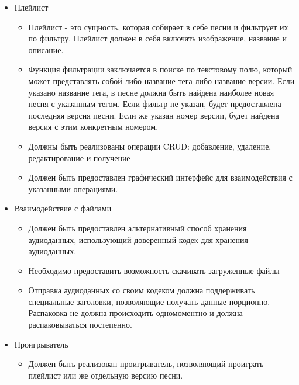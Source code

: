 \documentclass[a4paper, 12pt, oneside]{article}
\begin{document}
\begin{itemize}
\begin{itemize}
		\item Должен быть доступен чат внутри каждой из песен, где пользователи могут просматривать а также отправлять свои собственные сообщения
		\item Должна быть реализована возможность просмотра конкретной версии песни.
		\item Должны быть реализованы операции в API для выполнения вышеобозначенных операций.
		\item Необходимо предоставить графический интерфейс для работы с указанными операциями.
	\end{itemize}
	\item Плейлист
	\begin{itemize}
		\item Плейлист - это сущность, которая собирает в себе песни и фильтрует их по фильтру. Плейлист должен в себя включать изображение, название и описание.
		\item Функция фильтрации заключается в поиске по текстовому полю, который может представлять собой либо название тега либо название версии. Если указано название тега, в песне должна быть найдена наиболее новая песня с указанным тегом. Если фильтр не указан, будет предоставлена последняя версия песни. Если же указан номер версии, будет найдена версия с этим конкретным номером.
		\item Должны быть реализованы операции CRUD: добавление, удаление, редактирование и получение
		\item Должен быть предоставлен графический интерфейс для взаимодействия с указанными операциями.
	\end{itemize}
	\item Взаимодействие с файлами
	\begin{itemize}
		\item Должен быть предоставлен альтернативный способ хранения аудиоданных, использующий доверенный кодек для хранения аудиоданных.
		\item Необходимо предоставить возможность скачивать загруженные файлы
		\item Отправка аудиоданных со своим кодеком должна поддерживать специальные заголовки, позволяющие получать данные порционно. Распаковка не должна происходить одномоментно и должна распаковываться постепенно.
	\end{itemize}
	\item Проигрыватель
	\begin{itemize}
		\item Должен быть реализован проигрыватель, позволяющий проиграть плейлист или же отдельную версию песни.

\end{itemize}
\end{itemize}
\end{document}
